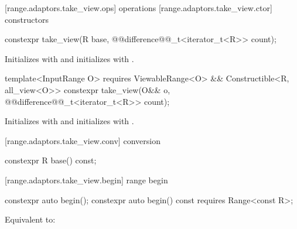 {[range.adaptors.take_view.ops]{ operations}
[range.adaptors.take_view.ctor]{ constructors}

%
\begin{itemdecl}
constexpr take_view(R base, @@difference@@_t<iterator_t<R>> count);
\end{itemdecl}

\begin{itemdescr}
\pnum
\effects Initializes  with  and initializes
 with .
\end{itemdescr}

%
\begin{itemdecl}
template<InputRange O>
  requires ViewableRange<O> && Constructible<R, all_view<O>>
constexpr take_view(O&& o, @@difference@@_t<iterator_t<R>> count);
\end{itemdecl}

\begin{itemdescr}
\pnum
\effects Initializes  with 
and initializes  with .
\end{itemdescr}

[range.adaptors.take_view.conv]{ conversion}

%
\begin{itemdecl}
constexpr R base() const;
\end{itemdecl}

\begin{itemdescr}
\pnum
\oldtxt{\returns}  
\end{itemdescr}

[range.adaptors.take_view.begin]{ range begin}

%
\begin{itemdecl}
constexpr auto begin();
constexpr auto begin() const requires Range<const R>;
\end{itemdecl}

\begin{itemdescr}
\pnum
\effects Equivalent to: 
\end{itemdescr}

}
